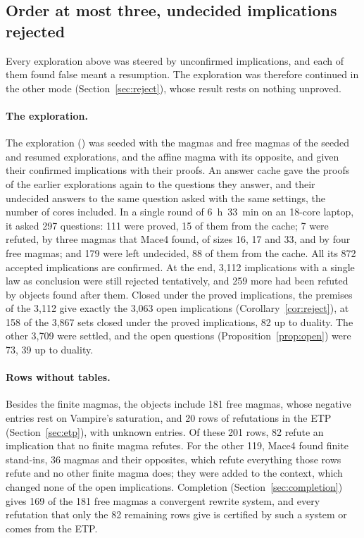 \documentclass[11pt,a4paper]{article}
\theoremstyle{definition}
\theoremstyle{remark}
\begin{document}
\subsection{Order at most three, undecided implications rejected}\label{sec:case3reject}

Every exploration above was steered by unconfirmed implications, and each of them found false meant a resumption. The exploration was therefore continued in the other mode (Section~\ref{sec:reject}), whose result rests on nothing unproved.

\paragraph{The exploration.}
The exploration () was seeded with the magmas and free magmas of the seeded and resumed explorations, and the affine magma with its opposite, and given their confirmed implications with their proofs. An answer cache gave the proofs of the earlier explorations again to the questions they answer, and their undecided answers to the same question asked with the same settings, the number of cores included. In a single round of 6~h~33~min on an 18-core laptop, it asked 297 questions: 111 were proved, 15 of them from the cache; 7 were refuted, by three magmas that Mace4 found, of sizes 16, 17 and 33, and by four free magmas; and 179 were left undecided, 88 of them from the cache. All its 872 accepted implications are confirmed. At the end, 3,112 implications with a single law as conclusion were still rejected tentatively, and 259 more had been refuted by objects found after them. Closed under the proved implications, the premises of the 3,112 give exactly the 3,063 open implications (Corollary~\ref{cor:reject}), at 158 of the 3,867 sets closed under the proved implications, 82 up to duality. The other 3,709 were settled, and the open questions (Proposition~\ref{prop:open}) were 73, 39 up to duality.

\paragraph{Rows without tables.}
Besides the finite magmas, the objects include 181 free magmas, whose negative entries rest on Vampire's saturation, and 20 rows of refutations in the ETP (Section~\ref{sec:etp}), with unknown entries. Of these 201 rows, 82 refute an implication that no finite magma refutes. For the other 119, Mace4 found finite stand-ins, 36 magmas and their opposites, which refute everything those rows refute and no other finite magma does; they were added to the context, which changed none of the open implications. Completion (Section~\ref{sec:completion}) gives 169 of the 181 free magmas a convergent rewrite system, and every refutation that only the 82 remaining rows give is certified by such a system or comes from the ETP.
\end{document}
